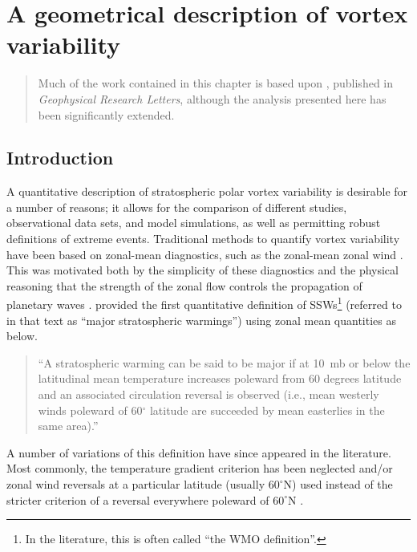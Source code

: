 \chapter{A geometrical description of vortex variability}
\begin{quotation}
  Much of the work contained in this chapter is based upon \citet{Seviour2013},
  published in \emph{Geophysical Research Letters}, although the analysis
  presented here has been significantly extended.
\end{quotation}

\label{cha:moments}




\section{Introduction}
\label{sec:moments-introduction}
A quantitative description of stratospheric polar vortex variability is
desirable for a number of reasons; it allows for the comparison of different
studies, observational data sets, and model simulations, as well as permitting
robust definitions of extreme events.  Traditional methods to quantify vortex
variability have been based on zonal-mean diagnostics, such as the zonal-mean
zonal wind \citep[e.g.,][]{Andrews1987}. This was motivated both by the
simplicity of these diagnostics and the physical reasoning that the strength of
the zonal flow controls the propagation of planetary waves \citep[][Section
\ref{sec:plan-waves-strat}]{Charney1961}. \citet{McInturff1978} provided the
first quantitative definition of SSWs\footnote{In the literature, this is often
  called ``the WMO definition''.} (referred to in that text as ``major
stratospheric warmings'') using zonal mean quantities as below.
\begin{quotation}
``A stratospheric warming can be said to be major if at 10~mb or below the
latitudinal mean temperature increases poleward from 60 degrees latitude and an
associated circulation reversal is observed (i.e., mean westerly winds poleward
of 60$^{\circ}$ latitude are succeeded by mean easterlies in the same area).''
\end{quotation}
A number of variations of this definition have since appeared in the
literature. Most commonly, the temperature gradient criterion has been neglected
and/or zonal wind reversals at a particular latitude (usually $60^{\circ}$N)
used instead of the stricter criterion of a reversal everywhere poleward of
$60^{\circ}$N \citep[e.g.,][]{Labitzke2000, Christiansen2001,
  Reichler2012}. 


